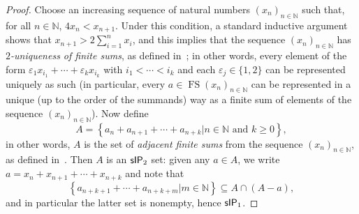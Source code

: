 \documentclass{jloganal}
\theoremstyle{definition}
\DeclareMathOperator{\fs}{FS}
\newcommand{\sip}{\mathnormal{\mathsf{sIP}}}
\begin{document}
\begin{proof}
    Choose an increasing sequence of natural numbers $(x_n)_{n\in\mathbb N}$ such that, for all $n\in\mathbb N$, $4x_n<x_{n+1}$. Under this condition, a standard inductive argument shows that $x_{n+1}>2\sum_{i=1}^n x_i$, and this implies that the sequence $(x_n)_{n\in\mathbb N}$ has {\it $2$-uniqueness of finite sums}, as defined in~\cite[Def. 2.5]{strongly-union-trivialsums}; in other words, every element of the form $\varepsilon_1 x_{i_1}+\cdots+\varepsilon_k x_{i_k}$ with $i_1<\cdots<i_k$ and each $\varepsilon_j\in\{1,2\}$ can be represented uniquely as such (in particular, every $a\in\fs(x_n)_{n\in\mathbb N}$ can be represented in a unique (up to the order of the summands) way as a finite sum of elements of the sequence $(x_n)_{n\in\mathbb N}$). Now define
    \begin{equation*}
        A=\left\{a_n+a_{n+1}+\cdots+a_{n+k}\big|n\in\mathbb N\text{ and }k\geq 0\right\},
    \end{equation*}
    in other words, $A$ is the set of {\it adjacent finite sums} from the sequence $(x_n)_{n\in\mathbb N}$, as defined in~\cite{carlucci-adjacent}. %
    Then $A$ is an $\sip_2$ set: given any $a\in A$, we write $a=x_n+x_{n+1}+\cdots+x_{n+k}$ and note that
    \begin{equation*}
        \left\{a_{n+k+1}+\cdots+a_{n+k+m}\big|m\in\mathbb N\right\}\subseteq A\cap(A-a),
    \end{equation*}
    and in particular the latter set is nonempty, hence $\sip_1$.


\end{proof}
\end{document}
